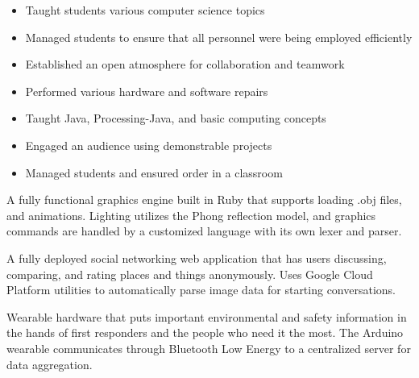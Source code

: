 \documentclass[10pt,a4paper,ragged2e,withhyper]{altacv}
\begin{document}
\begin{paracol}{2}
\divider{}

\begin{itemize}
\item Taught students various computer science topics
\item Managed students to ensure that all personnel were being employed efficiently
\item Established an open atmosphere for collaboration and teamwork
\item Performed various hardware and software repairs
\end{itemize}


\begin{itemize}
\item Taught Java, Processing-Java, and basic computing concepts
\item Engaged an audience using demonstrable projects
\item Managed students and ensured order in a classroom
\end{itemize}


\small

\small{}A fully functional graphics engine built in Ruby that supports loading .obj files, and animations.
Lighting utilizes the Phong reflection model, and graphics commands are handled by a customized language with its own lexer and parser.

\divider{}

\small{}A fully deployed social networking web application that has users discussing, comparing, and rating places and things anonymously.
Uses Google Cloud Platform utilities to automatically parse image data for starting conversations.

\divider{}

\small{}Wearable hardware that puts important environmental and safety information in the hands of first responders and the people who need it the most.
The Arduino wearable communicates through Bluetooth Low Energy to a centralized server for data aggregation.


\end{paracol}
\end{document}
